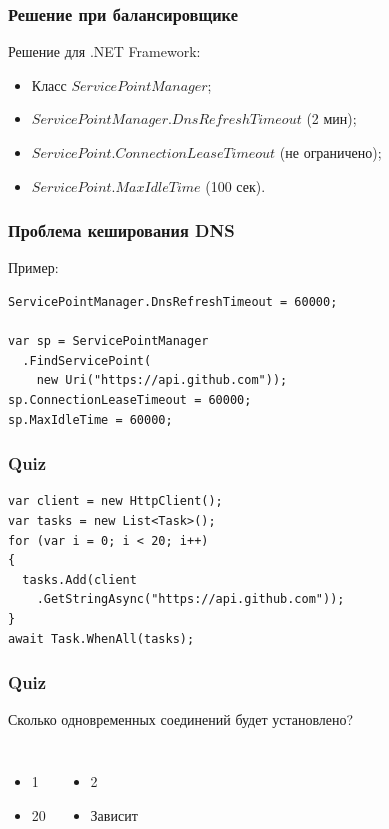 \documentclass[17pt,aspectratio=169]{beamer}
\begin{document}
\begin{frame}
\frametitle{Решение при балансировщике}
Решение для .NET Framework:
\begin{itemize}
	\item <1-> Класс $ServicePointManager$;
	\item <2-> $ServicePointManager.DnsRefreshTimeout$ (2 мин);
	\item <3-> $ServicePoint.ConnectionLeaseTimeout$ (не ограничено);
	\item <4-> $ServicePoint.MaxIdleTime$ (100 сек).
\end{itemize}
\end{frame}

\begin{frame}[fragile]
\frametitle{Проблема кеширования DNS}
Пример:
\begin{lstlisting}
ServicePointManager.DnsRefreshTimeout = 60000;

var sp = ServicePointManager
  .FindServicePoint(
    new Uri("https://api.github.com"));
sp.ConnectionLeaseTimeout = 60000;
sp.MaxIdleTime = 60000;
\end{lstlisting}
\end{frame}

\begin{frame}[fragile]
\frametitle{Quiz}
\begin{lstlisting}
var client = new HttpClient();
var tasks = new List<Task>();
for (var i = 0; i < 20; i++)
{
  tasks.Add(client
    .GetStringAsync("https://api.github.com"));
}
await Task.WhenAll(tasks);
\end{lstlisting}
\end{frame}

\begin{frame}
\frametitle{Quiz}
Сколько одновременных соединений будет установлено?
\newline
\begin{columns}
\begin{itemize}
\item <1> 1
\item <1> 20
\end{itemize}
\begin{itemize}
\item <1,2> 2
\item <1> Зависит
\end{itemize}
\end{columns}
\end{frame}
\end{document}

